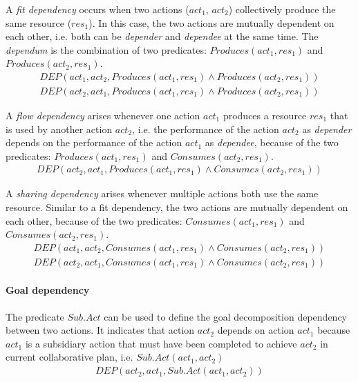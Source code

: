 A \emph{fit dependency} occurs when two actions ($act_1$, $act_2$) collectively produce the same resource ($res_1$). In this case, the two actions  are mutually dependent on each other, i.e. both can be \emph{depender} and \emph{dependee} at the same time. The \emph{dependum} is the combination of two predicates: $Produces(act_1, res_1)$ and $Produces(act_2, res_1)$.
\begin{align*} 
	 DEP(act_1, act_2, Produces(act_1, res_1) \land Produces(act_2, res_1))\\
	 DEP(act_2, act_1, Produces(act_1, res_1) \land Produces(act_2, res_1))
\end{align*}

A \emph{flow dependency} arises whenever one action $act_1$ produces a resource $res_1$ that is used by another action $act_2$, i.e. the performance of the action $act_2$ as \emph{depender} depends on the performance of the action $act_1$ as \emph{dependee}, because of the two predicates: $Produces(act_1, res_1)$ and $Consumes(act_2, res_1)$.
\begin{align*} 
	 DEP(act_2, act_1, Produces(act_1, res_1) \land Consumes(act_2, res_1))
\end{align*}

A \emph{sharing dependency} arises whenever multiple actions both use the same resource. Similar to a fit dependency, the two actions are mutually dependent on each other, because of the two predicates: $Consumes(act_1, res_1)$ and $Consumes(act_2, res_1)$.
\begin{align*} 
	 DEP(act_1, act_2, Consumes(act_1, res_1) \land Consumes(act_2, res_1))\\
	 DEP(act_2, act_1, Consumes(act_1, res_1) \land Consumes(act_2, res_1))
\end{align*}

\paragraph*{Goal dependency} %
\label{par:goal_dependency}
The predicate $Sub.Act$ can be used to define the goal decomposition dependency between two actions. It indicates that action $act_2$ depends on action $act_1$ because $act_1$ is a subsidiary action that must have been completed to achieve $act_2$ in current collaborative plan, i.e. $Sub.Act(act_1, act_2)$
\begin{align*} 
	 DEP(act_2, act_1, Sub.Act(act_1, act_2))
\end{align*}

